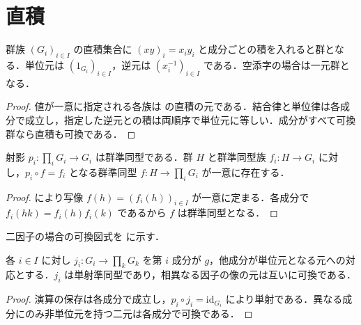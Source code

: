 \section{直積}
\begin{prop}[群の直積]
群族 $(G_i)_{i\in I}$ の直積集合に $(xy)_i=x_iy_i$ と成分ごとの積を入れると群となる．単位元は $(1_{G_i})_{i\in I}$，逆元は $(x_i^{-1})_{i\in I}$ である．空添字の場合は一元群となる．
\end{prop}
\begin{proof}
値が一意に指定される各族は  の直積の元である．結合律と単位律は各成分で成立し，指定した逆元との積は両順序で単位元に等しい．成分がすべて可換群なら直積も可換である．
\end{proof}
\begin{prop}[群の直積の普遍性]
射影 $p_i:\prod_i G_i\to G_i$ は群準同型である．群 $H$ と群準同型族 $f_i:H\to G_i$ に対し，$p_i\circ f=f_i$ となる群準同型 $f:H\to\prod_i G_i$ が一意に存在する．
\end{prop}
\begin{proof}
 により写像 $f(h)=(f_i(h))_{i\in I}$ が一意に定まる．各成分で $f_i(hk)=f_i(h)f_i(k)$ であるから $f$ は群準同型となる．
\end{proof}
二因子の場合の可換図式を  に示す．
\begin{prop}[直積への標準埋込み]
各 $i\in I$ に対し $j_i:G_i\to\prod_k G_k$ を第 $i$ 成分が $g$，他成分が単位元となる元への対応とする．$j_i$ は単射準同型であり，相異なる因子の像の元は互いに可換である．
\end{prop}
\begin{proof}
演算の保存は各成分で成立し，$p_i\circ j_i=\mathrm{id}_{G_i}$ により単射である．異なる成分にのみ非単位元を持つ二元は各成分で可換である．
\end{proof}
